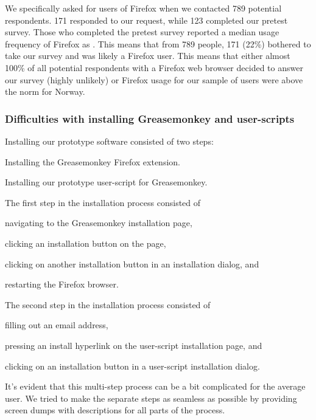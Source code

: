 We specifically asked for users of Firefox when we contacted
789 potential respondents. 171 responded to our request, while 123 completed
our pretest survey.%
Those who completed the pretest survey reported a median usage frequency of
Firefox as
.%
This means that from 789 people, 171 (22\%) bothered to take our survey and
was likely a Firefox user.
This means that either almost 100\% of all potential respondents with a
Firefox web browser decided to answer our survey (highly unlikely) or Firefox
usage for our sample of \urort{} users were above the norm for Norway.

\subsubsection{Difficulties with installing Greasemonkey and user-scripts}

Installing our prototype software consisted of two steps:

\begin{enum}
  \item Installing the Greasemonkey Firefox extension.
  \item Installing our prototype user-script for Greasemonkey.
\end{enum}

The first step in the installation process consisted of
\begin{inparaenum}[(i)]
  \item navigating to the Greasemonkey installation page,
  \item clicking an installation button on the page,
  \item clicking on another installation button in an installation
    dialog, and
  \item restarting the Firefox browser.
\end{inparaenum}
The second step in the installation process consisted of
\begin{inparaenum}[(i)]
  \item filling out an email address,%
  \item pressing an install hyperlink on the user-script installation page,
    and
  \item clicking on an installation button in a user-script installation
    dialog.
\end{inparaenum}
It's evident that this multi-step process can be a bit complicated for the
average user. We tried to make the separate steps as seamless as possible
by providing screen dumps with descriptions for all parts of the process.

